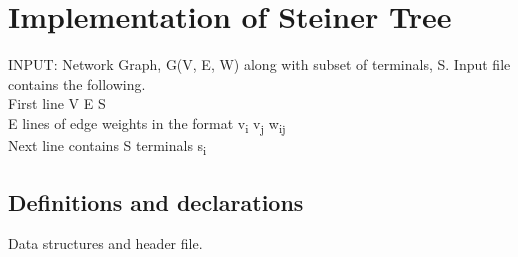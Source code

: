 \documentclass[a4paper]{article}
\begin{document}
\section{Implementation of Steiner Tree}
INPUT: Network Graph, G(V, E, W) along with subset of terminals, S. Input file contains the following.\\
First line V E S \\
E lines of edge weights in the format v\textsubscript{i} v\textsubscript{j} w\textsubscript{ij}\\
Next line contains S terminals s\textsubscript{i}\\

\subsection{Definitions and declarations}
Data structures and header file.
\end{document}
